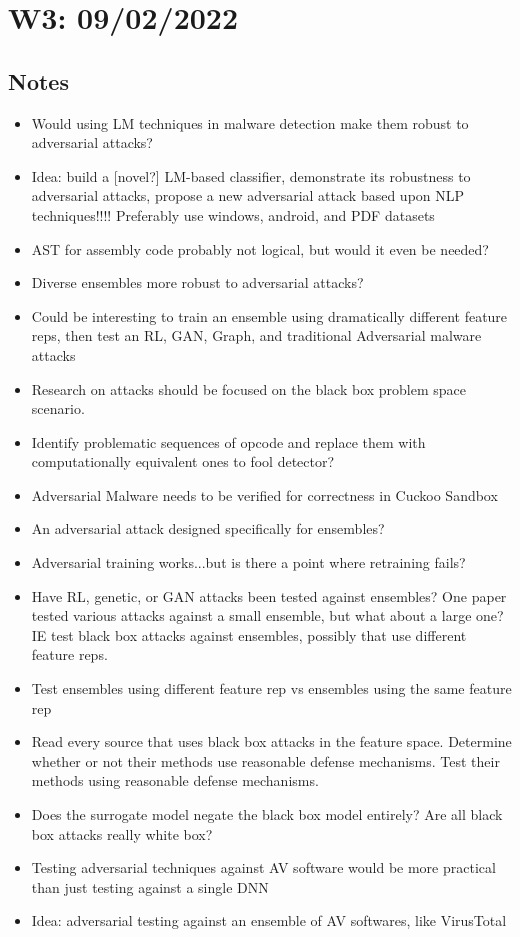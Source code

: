 \documentclass{article}
\begin{document}

\section*{W3: 09/02/2022}

\subsection*{Notes}

\begin{itemize}
	\item Would using LM techniques in malware detection make them robust to adversarial attacks?
	\item Idea: build a [novel?] LM-based classifier, demonstrate its robustness to adversarial attacks, propose a new adversarial attack based upon NLP techniques!!!! Preferably use windows, android, and PDF datasets
	\item AST for assembly code probably not logical, but would it even be needed?
	\item Diverse ensembles more robust to adversarial attacks?
	\item Could be interesting to train an ensemble using dramatically different feature reps, then test an RL, GAN, Graph, and traditional Adversarial malware attacks
	\item Research on attacks should be focused on the black box problem space scenario.
	\item Identify problematic sequences of opcode and replace them with computationally equivalent ones to fool detector?
	\item Adversarial Malware needs to be verified for correctness in Cuckoo Sandbox
	\item An adversarial attack designed specifically for ensembles?
	\item Adversarial training works...but is there a point where retraining fails?
	\item Have RL, genetic, or GAN attacks been tested against ensembles? One paper tested various attacks against a small ensemble, but what about a large one? IE test black box attacks against ensembles, possibly that use different feature reps.
	\item Test ensembles using different feature rep vs ensembles using the same feature rep
	\item Read every source that uses black box attacks in the feature space. Determine whether or not their methods use reasonable defense mechanisms. Test their methods using reasonable defense mechanisms.
	\item Does the surrogate model negate the black box model entirely? Are all black box attacks really white box?
	\item Testing adversarial techniques against AV software would be more practical than just testing against a single DNN
	\item Idea: adversarial testing against an ensemble of AV softwares, like VirusTotal
\end{itemize}
\end{document}
